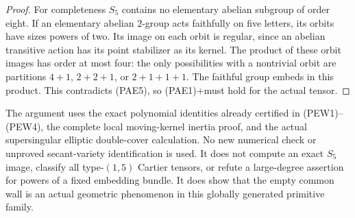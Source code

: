 \begin{proof}
For completeness \(S_5\) contains no elementary abelian
subgroup of order eight.  If an elementary abelian \(2\)-group
acts faithfully on five letters, its orbits have sizes powers
of two.  Its image on each orbit is regular, since an abelian
transitive action has its point stabilizer as its kernel.
The product of these orbit images has order at most four:
the only possibilities with a nontrivial orbit are partitions
\(4+1\), \(2+2+1\), or \(2+1+1+1\).  The faithful group
embeds in this product.  This contradicts (PAE5), so (PAE1)+must hold for the actual tensor.
\end{proof}

\begin{remark}
\label{rem:prime-five-actual-exceptional-ratio-scope}
The argument uses the exact polynomial identities already
certified in (PEW1)--(PEW4), the complete local moving-kernel
inertia proof, and the actual supersingular elliptic double-cover
calculation.  No new numerical check or unproved secant-variety
identification is used.  It does not compute an exact \(S_5\)
image, classify all type-\((1,5)\) Cartier tensors, or refute a
large-degree assertion for powers of a fixed embedding bundle.
It does show that the empty common wall is an actual geometric
phenomenon in this globally generated primitive family.
\end{remark}
